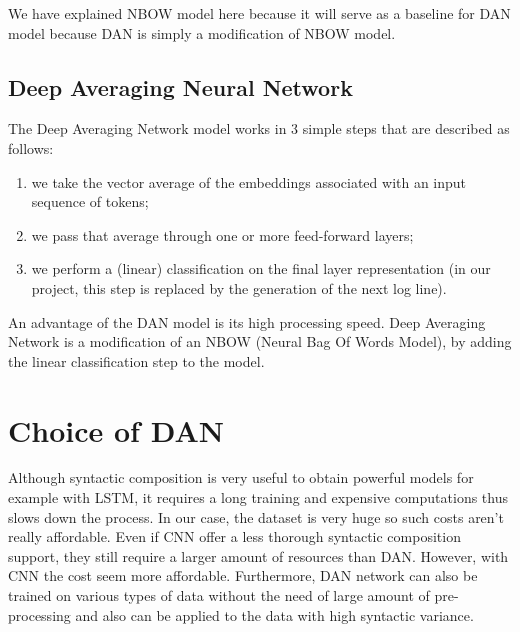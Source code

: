 We have explained NBOW model here because it will serve as a baseline for DAN model because DAN is simply a modification of NBOW model.

\subsection{Deep Averaging Neural Network \label{sec:dan}}
The Deep Averaging Network \cite{dan_1, dan_2} model works in 3 simple steps that are described as follows:
\begin{enumerate}
	\item we take the vector average of the embeddings associated with an input sequence of tokens;
	\item we pass that average through one or more feed-forward layers;
	\item we perform a (linear) classification on the final layer representation (in our project, this step is replaced by the generation of the next log line).
\end{enumerate}

An advantage of the DAN model is its high processing speed.
Deep Averaging Network is a modification of an NBOW (Neural Bag Of Words Model), by adding the linear classification step to the model.

\section*{Choice of DAN}

Although syntactic composition is very useful to obtain powerful models for example with LSTM, it requires a long training and expensive computations thus slows down the process. In our case, the dataset is very huge so such costs aren't really affordable.
Even if CNN offer a less thorough syntactic composition support, they still require a larger amount of resources than DAN. However, with CNN the cost seem more affordable.
Furthermore, DAN network can also be trained on various types of data without the need of large amount of pre-processing and also can be applied to the data with high syntactic variance.
